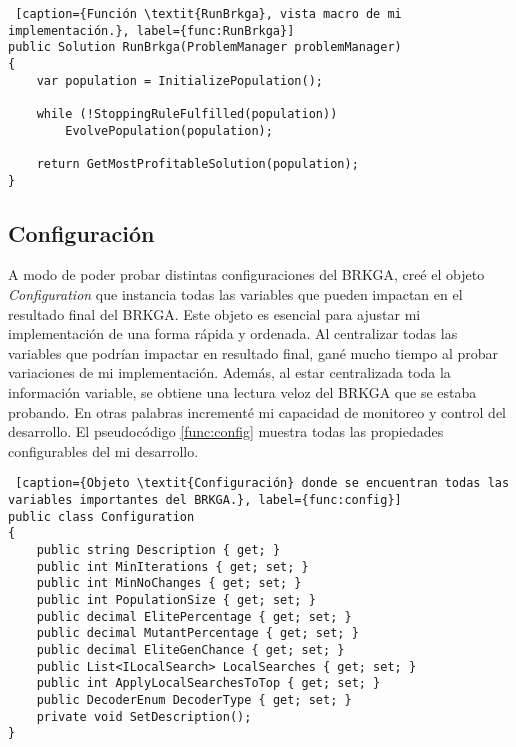 \bigskip

\begin{minipage}{\linewidth}
\begin{lstlisting} [caption={Función \textit{RunBrkga}, vista macro de mi implementación.}, label={func:RunBrkga}]
public Solution RunBrkga(ProblemManager problemManager)
{
    var population = InitializePopulation();

    while (!StoppingRuleFulfilled(population))
        EvolvePopulation(population);

    return GetMostProfitableSolution(population);
}
\end{lstlisting}
\end{minipage}

\subsection{Configuración} \label{sec:config}

A modo de poder probar distintas configuraciones del BRKGA, creé el objeto \textit{Configuration} que instancia todas las variables que pueden impactan en el resultado final del BRKGA. Este objeto es esencial para ajustar mi implementación de una forma rápida y ordenada. Al centralizar todas las variables que podrían impactar en resultado final, gané mucho tiempo al probar variaciones de mi implementación. Además, al estar centralizada toda la información variable, se obtiene una lectura veloz del BRKGA que se estaba probando. En otras palabras incrementé mi capacidad de monitoreo y control del desarrollo. El pseudocódigo \ref{func:config} muestra todas las propiedades configurables del mi desarrollo.

\bigskip

\begin{minipage}{\linewidth}
\begin{lstlisting} [caption={Objeto \textit{Configuración} donde se encuentran todas las variables importantes del BRKGA.}, label={func:config}]
public class Configuration
{
	public string Description { get; }
	public int MinIterations { get; set; }
	public int MinNoChanges { get; set; }
	public int PopulationSize { get; set; }
	public decimal ElitePercentage { get; set; }
	public decimal MutantPercentage { get; set; }
	public decimal EliteGenChance { get; set; }
	public List<ILocalSearch> LocalSearches { get; set; }
	public int ApplyLocalSearchesToTop { get; set; }
	public DecoderEnum DecoderType { get; set; }	
	private void SetDescription();
}
\end{lstlisting}
\end{minipage}

